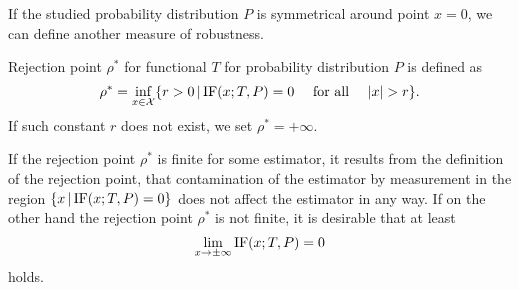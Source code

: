 If the studied probability distribution $P$ is symmetrical around point $x=0$, we can define another measure of robustness.

\begin{definition}
	Rejection point $\rho^*$ for functional $T$ for probability distribution $P$ is defined as 
	\begin{equation}
			\rho^* = \inf_{x \in \mathcal{X}} \lbrace r>0 \, | \, \mathrm{IF}({x};T,P) = 0 \quad \text{ for all }\quad |x| > r\rbrace.
	\end{equation}
	If such constant $r$  does not exist, we set $\rho^* = + \infty.$ 
\end{definition}

If the rejection point $\rho^*$ is finite for some estimator, it results from the definition of the rejection point, that contamination of the estimator by measurement in the region  $\lbrace x \, | \, \mathrm{IF}({x};T,P) = 0 \rbrace$ does not affect the estimator in any way. If on the other hand the rejection point $\rho^*$ is not finite, it is desirable that at least
\begin{equation}
	\lim_{x \rightarrow \pm\infty} \mathrm{IF}({x};T,P) = 0
\end{equation}
holds.

